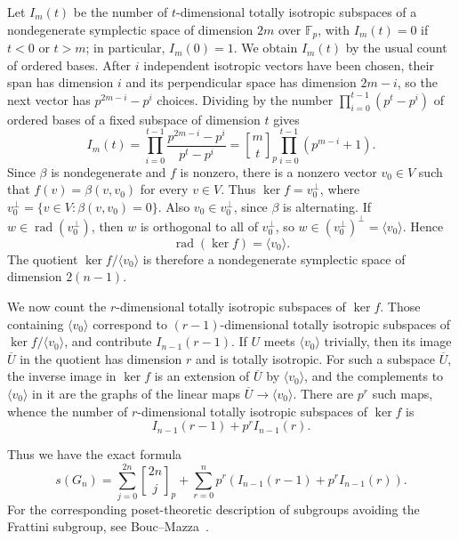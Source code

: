 \documentclass[a4paper,11pt,reqno]{amsart}
\theoremstyle{plain}
\theoremstyle{remark}
\numberwithin{equation}{section}
\newcommand{\gauss}[2]{\genfrac{[}{]}{0pt}{}{#1}{#2}_p}
\begin{document}
Let $I_m(t)$ be the number of $t$-dimensional totally isotropic subspaces of
a nondegenerate symplectic space of dimension $2m$ over $\mathbb F_p$, with
$I_m(t)=0$ if $t<0$ or $t>m$; in particular, $I_m(0)=1$. We obtain $I_m(t)$ by the usual count of ordered bases. After $i$ independent isotropic vectors have been chosen, 
their span has dimension $i$ and its perpendicular space has dimension $2m-i$, 
so the next vector has $p^{2m-i}-p^i$ choices. Dividing by the number
$\prod_{i=0}^{t-1}(p^t-p^i)$ of ordered bases of a fixed subspace of
dimension $t$ gives
\[
        I_m(t)
        =
        \prod_{i=0}^{t-1}\frac{p^{2m-i}-p^i}{p^t-p^i}
        =
        \gauss{m}{t}\prod_{i=0}^{t-1}(p^{m-i}+1).
\]
Since $\beta$ is nondegenerate and $f$ is nonzero, there is a nonzero vector
$v_0\in V$ such that $f(v)=\beta(v,v_0)$ for every $v\in V$. Thus
$\ker f=v_0^\perp$, where $v_0^\perp=\{v\in V:\beta(v,v_0)=0\}$. Also
$v_0\in v_0^\perp$, since $\beta$ is alternating. If
$w\in\operatorname{rad}(v_0^\perp)$, then $w$ is orthogonal to all of
$v_0^\perp$, so $w\in(v_0^\perp)^\perp=\langle v_0\rangle$. Hence
\[
        \operatorname{rad}(\ker f)=\langle v_0\rangle.
\]
The quotient $\ker f/\langle v_0\rangle$ is therefore a nondegenerate
symplectic space of dimension $2(n-1)$.

We now count the $r$-dimensional totally isotropic subspaces of $\ker f$.
Those containing $\langle v_0\rangle$ correspond to $(r-1)$-dimensional totally
isotropic subspaces of $\ker f/\langle v_0\rangle$, and contribute
$I_{n-1}(r-1)$. If $U$ meets $\langle v_0\rangle$ trivially, then its image
$\overline U$ in the quotient has dimension $r$ and is totally isotropic. For
such a subspace $\overline U$, the inverse image in $\ker f$ is an extension
of $\overline U$ by $\langle v_0\rangle$, and the complements to
$\langle v_0\rangle$ in it are the graphs of the linear maps
$\overline U\to\langle v_0\rangle$. There are $p^r$ such maps, whence the number
of $r$-dimensional totally isotropic subspaces of $\ker f$ is
\[
        I_{n-1}(r-1)+p^rI_{n-1}(r).
\]

Thus we have the exact formula
\begin{equation}\label{eq:extraspecial-count}
        s(G_n)
        =
        \sum_{j=0}^{2n}\gauss{2n}{j}
        +
        \sum_{r=0}^{n}
        p^r\left(I_{n-1}(r-1)+p^rI_{n-1}(r)\right).
\end{equation}
For the corresponding poset-theoretic description of subgroups avoiding the
Frattini subgroup, see Bouc--Mazza~\cite[Secs.~2 and~4]{BoucMazza}.
\end{document}
